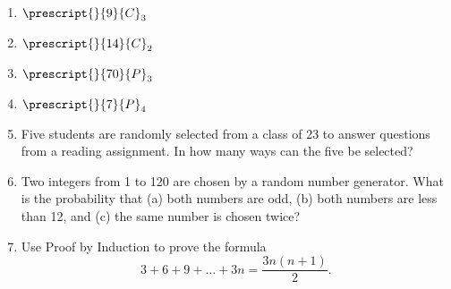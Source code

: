 \documentclass[letterpaper]{article}
\begin{document}
\begin{enumerate}[resume]
	\item $\prescript{}{9}{C}_3$
	\item $\prescript{}{14}{C}_2$
	\item $\prescript{}{70}{P}_3$
	\item $\prescript{}{7}{P}_4$
	\item Five students are randomly selected from a class of 23 to answer questions from a reading assignment. In how many ways can the five be selected? 
	\item Two integers from 1 to 120 are chosen by a random number generator. What is the probability that (a) both numbers are odd, (b) both numbers are less than 12, and (c) the same number is chosen twice?
	\item Use Proof by Induction to prove the formula
	$$3+6+9+\dots+3n=\frac{3n(n+1)}{2}.$$
	

\end{enumerate}
\end{document}
